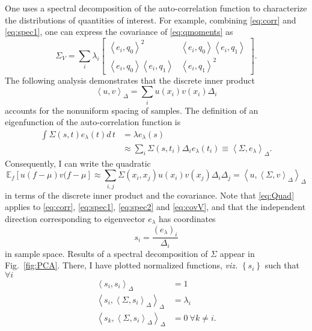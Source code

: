 \documentclass[]{article}
\newcommand{\field}[1]{\mathbb{#1}}
\newcommand\Polytope[1]{\field{P}_{#1}}
\newcommand{\EV}[2]{\field{E}_{#1}\left[#2\right]}
\newcommand\inner[2]{\left<#1,#2\right>}
\begin{document}
One uses a spectral decomposition of the auto-correlation function to
characterize the distributions of quantities of interest.  For
example, combining \eqref{eq:corr} and \eqref{eq:spec1}, one can
express the covariance of \eqref{eq:qmoments} as
\begin{equation}
  \label{eq:covV}
  \Sigma_V = \sum_i \lambda_i
  \begin{bmatrix}
    \inner{e_{i}}{q_0}^2 & \inner{e_{i}}{q_0}
    \inner{e_{i}}{q_1} \\
    \inner{e_{i}}{q_0} \inner{e_{i}}{q_1} &
    \inner{e_{i}}{q_1}^2
  \end{bmatrix}.
\end{equation}
The following analysis demonstrates that the discrete inner
product
\begin{equation}
  \label{eq:inner}
  \inner{u}{v}_\Delta = \sum_i u(x_i) v(x_i) \Delta_i
\end{equation}
accounts for the nonuniform spacing of samples.
The definition of an eigenfunction of the auto-correlation function is
\begin{align*}
  \int \Sigma(s,t) e_\lambda(t) d\, t &= \lambda e_\lambda(s) \\
  &\approx \sum_i \Sigma(s,t_i) \Delta_i e_\lambda(t_i) \equiv \inner{
    \Sigma}{e_\lambda}_\Delta.
\end{align*}
Consequently, I can write the quadratic
\begin{equation}
  \label{eq:Quad}
  \EV{f}{u(f-\mu)v(f-\mu} \approx \sum_{i,j} \Sigma(x_i,x_j) u(x_i)
  v(x_j) \Delta_i \Delta_j = \inner{u}{ \inner{\Sigma}{v }_\Delta
  }_\Delta
\end{equation}
in terms of the discrete inner product and the covariance.  Note that
\eqref{eq:Quad} applies to \eqref{eq:corr}, \eqref{eq:spec1},
\eqref{eq:spec2} and \eqref{eq:covV}, and that the independent
direction corresponding to eigenvector $e_\lambda$ has coordinates
\begin{equation*}
  s_i = \frac{\left( e_\lambda \right)_i }{ \Delta_i }
\end{equation*}
in sample space.  Results of a spectral decomposition of $\Sigma$
appear in Fig.~\ref{fig:PCA}.  There, I have plotted normalized
functions, \emph{viz.} $\left\{ s_i \right\}$ such that $\forall i$
\begin{align*}
  \inner{s_i}{s_i}_{\Delta} &= 1 \\
  \inner{s_i}{\inner{\Sigma}{s_i}_{\Delta}}_\Delta &= \lambda_i \\
  \inner{s_k}{\inner{\Sigma}{s_i}_{\Delta}}_\Delta &= 0 ~\forall k \ne
  i.
\end{align*}
\begin{figure*}
  \centering
    \caption{A principal component analysis of $\Polytope{1000}$.  The
      eigenvalues $\lambda_i$ of the covariance appear in the upper
      plot.  The eigenfunctions corresponding to the five largest
      eigenvalues appear in the lower plot.}
  \label{fig:PCA}
\end{figure*}
\end{document}
